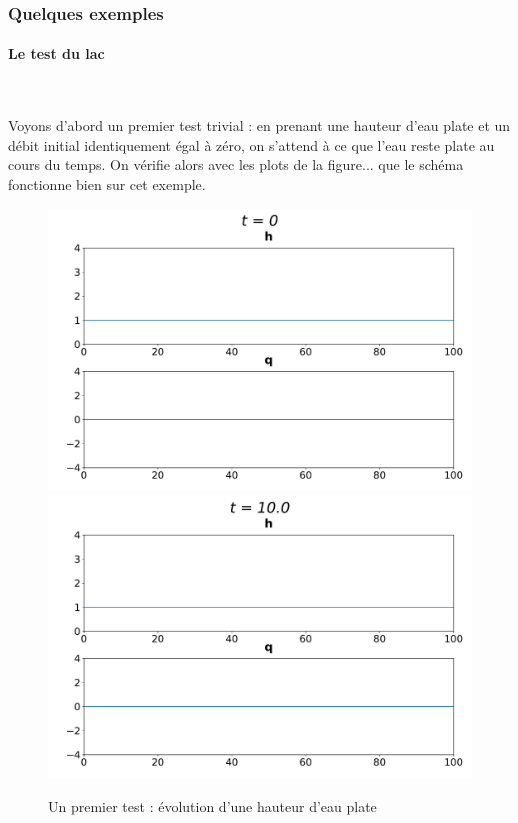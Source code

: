 \documentclass[
11pt, %
francais, %
singlespacing, %
headsepline, %
]{MastersDoctoralThesis} %
\begin{document}
\subsubsection{Quelques exemples}

\paragraph{Le test du lac} \

Voyons d'abord un premier test trivial : en prenant une hauteur d'eau plate et un débit initial identiquement égal à zéro, on s'attend à ce que l'eau reste plate au cours du temps.
On vérifie 	alors avec les plots de la figure... que le schéma fonctionne bien sur cet exemple.

\begin{figure}
\includegraphics[scale = .6]{"plat0"}
\includegraphics[scale = .6]{"plat10"} 
\caption{Un premier test : évolution d'une hauteur d'eau plate}
\end{figure}
\end{document}
